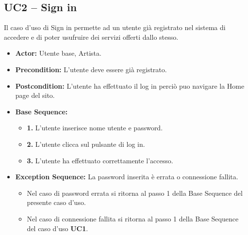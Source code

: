 \subsection{UC2 -- Sign in}
Il caso d'uso di Sign in permette ad un utente già registrato nel sistema di accedere e di poter 
usufruire dei servizi offerti dallo stesso.
\begin{itemize}
    \item \textbf{Actor:} Utente base, Artista.
    \item \textbf{Precondition:} L'utente deve essere già registrato.
    \item \textbf{Postcondition:} L'utente ha effettuato il log in perciò puo navigare la Home page del sito.
    \item \textbf{Base Sequence:}
    \begin{itemize}
        \item \textbf{1.} L'utente inserisce nome utente e password.
        \item \textbf{2.} L'utente clicca sul pulsante di log in.
        \item \textbf{3.} L'utente ha effettuato correttamente l'accesso.
    \end{itemize}
    \item \textbf{Exception Sequence:} La password inserita è errata o connessione fallita.
    \begin{itemize}
        \item Nel caso di password errata si ritorna al passo 1 della Base Sequence del presente caso d'uso.
        \item Nel caso di connessione fallita si ritorna al passo 1 della Base Sequence del caso d'uso \textbf{UC1}.
    \end{itemize}
\end{itemize}

\vspace{1cm}

